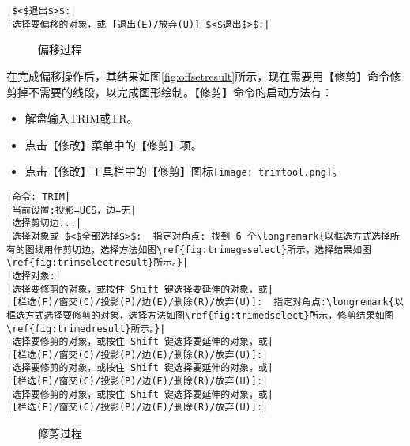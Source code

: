 \begin{procedure}
\begin{lstlisting}
|$<$退出$>$:|
|选择要偏移的对象，或 [退出(E)/放弃(U)] $<$退出$>$:|
\end{lstlisting}
\begin{figure}[htbp]
\hspace{20pt}
\hspace{20pt}
\caption{偏移过程}
\end{figure}
\item 在完成偏移操作后，其结果如图\ref{fig:offsetresult}所示，现在需要用【修剪】命令修剪掉不需要的线段，以完成图形绘制。【修剪】命令的启动方法有：
\begin{itemize}
\item 解盘输入TRIM或TR。
\item 点击【修改】菜单中的【修剪】项。
\item 点击【修改】工具栏中的【修剪】图标\texttt{[image: trimtool.png]}。
\end{itemize}
\begin{lstlisting}
|命令: TRIM|
|当前设置:投影=UCS，边=无|
|选择剪切边...|
|选择对象或 $<$全部选择$>$:  指定对角点: 找到 6 个\longremark{以框选方式选择所有的图线用作剪切边，选择方法如图\ref{fig:trimegeselect}所示，选择结果如图\ref{fig:trimselectresult}所示。}|
|选择对象:|
|选择要修剪的对象，或按住 Shift 键选择要延伸的对象，或|
|[栏选(F)/窗交(C)/投影(P)/边(E)/删除(R)/放弃(U)]:  指定对角点:\longremark{以框选方式选择要修剪的对象，选择方法如图\ref{fig:trimedselect}所示，修剪结果如图\ref{fig:trimedresult}所示。}|
|选择要修剪的对象，或按住 Shift 键选择要延伸的对象，或|
|[栏选(F)/窗交(C)/投影(P)/边(E)/删除(R)/放弃(U)]:|
|选择要修剪的对象，或按住 Shift 键选择要延伸的对象，或|
|[栏选(F)/窗交(C)/投影(P)/边(E)/删除(R)/放弃(U)]:|
|选择要修剪的对象，或按住 Shift 键选择要延伸的对象，或|
|[栏选(F)/窗交(C)/投影(P)/边(E)/删除(R)/放弃(U)]:|
\end{lstlisting}
\begin{figure}[htbp]
\hspace{20pt}
\hspace{20pt}
\hspace{20pt}
\caption{修剪过程}
\end{figure}
\showremarks
\end{procedure}
